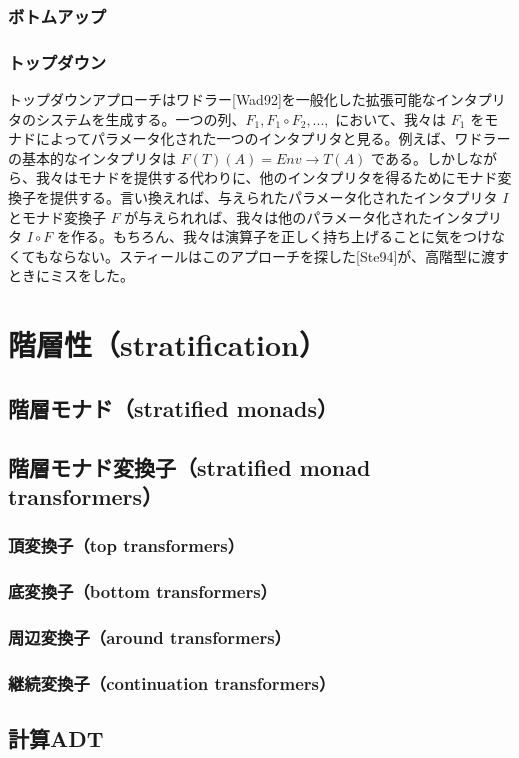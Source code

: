 \documentclass[11pt, oneside]{jsbook}   	%
\begin{document}
\subsection{ ボトムアップ }
\subsection{ トップダウン }
トップダウンアプローチはワドラー[Wad92]を一般化した拡張可能なインタプリタのシステムを生成する。一つの列、$F_1, F_1 \circ F_2, ... ,$ において、我々は $F_1$ をモナドによってパラメータ化された一つのインタプリタと見る。例えば、ワドラーの基本的なインタプリタは $F(T)(A) = Env \rightarrow T(A)$ である。しかしながら、我々はモナドを提供する代わりに、他のインタプリタを得るためにモナド変換子を提供する。言い換えれば、与えられたパラメータ化されたインタプリタ $I$ とモナド変換子 $F$ が与えられれば、我々は他のパラメータ化されたインタプリタ $I \circ F$ を作る。もちろん、我々は演算子を正しく持ち上げることに気をつけなくてもならない。スティールはこのアプローチを探した[Ste94]が、高階型に渡すときにミスをした。

\newpage
\chapter{ 階層性（stratification）}
\section{ 階層モナド（stratified monads） }
\section{ 階層モナド変換子（stratified monad transformers） }
\subsection{ 頂変換子（top transformers） }
\subsection{ 底変換子（bottom transformers） }
\subsection{ 周辺変換子（around transformers） }
\subsection{ 継続変換子（continuation transformers） }
\section{ 計算ADT }
\end{document}
